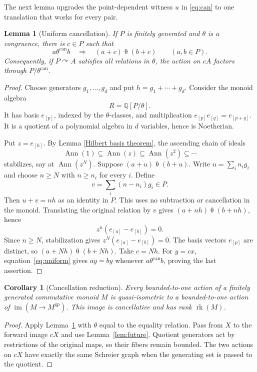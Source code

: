 \documentclass[11pt,letterpaper]{article}
\newtheorem{lemma}[theorem]{Lemma}
\newtheorem{corollary}[theorem]{Corollary}
\theoremstyle{definition}
\DeclareMathOperator{\rk}{rk}
\DeclareMathOperator{\im}{im}
\newcommand{\QQ}{\mathbb Q}
\newcommand{\gp}{\mathrm{gp}}
\newcommand{\act}{\curvearrowright}
\begin{document}
The next lemma upgrades the point-dependent witness $u$ in
\eqref{eq:can} to one translation that works for every pair.

\begin{lemma}[Uniform cancellation]\label{lem:uniform}
If $P$ is finitely generated and $\theta$ is a congruence, there is $c\in P$
such that
\begin{equation}\label{eq:uniform}
 a\mathrel{\theta^{\mathrm{can}}}b
 \quad\Longrightarrow\quad
 (a+c)\mathrel\theta (b+c)
 \qquad(a,b\in P).
\end{equation}
Consequently, if $P\act A$ satisfies all relations in $\theta$, the action
on $cA$ factors through $P/\theta^{\mathrm{can}}$.
\end{lemma}

\begin{proof}
Choose generators $g_1,\ldots,g_d$ and put $h=g_1+\cdots+g_d$. Consider
the monoid algebra
\[
 R=\QQ[P/\theta].
\]
It has basis $e_{[p]}$, indexed by the $\theta$-classes, and multiplication
$e_{[p]}e_{[q]}=e_{[p+q]}$. It is a quotient of a polynomial algebra in $d$
variables, hence is Noetherian.

Put $z=e_{[h]}$. By Lemma \ref{Hilbert basis theorem}, the ascending chain of ideals
\[
 \operatorname{Ann}(1)\subseteq\operatorname{Ann}(z)
 \subseteq\operatorname{Ann}(z^2)\subseteq\cdots
\]
stabilizes, say at $\operatorname{Ann}(z^N)$. Suppose
$(a+u)\mathrel\theta(b+u)$. Write $u=\sum_i n_i g_i$ and choose
$n\ge N$ with $n\ge n_i$ for every $i$. Define
\[
 v=\sum_i(n-n_i)g_i\in P.
\]
Then $u+v=nh$ as an identity in $P$. This uses no subtraction or
cancellation in the monoid. Translating the original relation by $v$
gives $(a+nh)\mathrel\theta(b+nh)$, hence
\[
 z^n(e_{[a]}-e_{[b]})=0.
\]
Since $n\ge N$, stabilization gives $z^N(e_{[a]}-e_{[b]})=0$.
The basis vectors $e_{[p]}$ are distinct, so
$(a+Nh)\mathrel\theta(b+Nh)$. Take $c=Nh$.
For $y=cx$, equation~\eqref{eq:uniform} gives $ay=by$ whenever
$a\mathrel{\theta^{\mathrm{can}}}b$, proving the last assertion.
\end{proof}

\begin{corollary}[Cancellation reduction]\label{cor:cancellation}
Every bounded-to-one action of a finitely generated commutative monoid $M$
is quasi-isometric to a bounded-to-one action of
$\im(M\to M^{\gp})$. This image is cancellative and has rank $\rk(M)$.
\end{corollary}

\begin{proof}
Apply Lemma~\ref{lem:uniform} with $\theta$ equal to the equality relation. Pass from
$X$ to the forward image $cX$ and use Lemma~\ref{lem:future}. Quotient
generators act by restrictions of the original maps, so their fibers
remain bounded. The two actions on $cX$ have exactly the same Schreier
graph when the generating set is passed to the quotient.
\end{proof}
\end{document}
